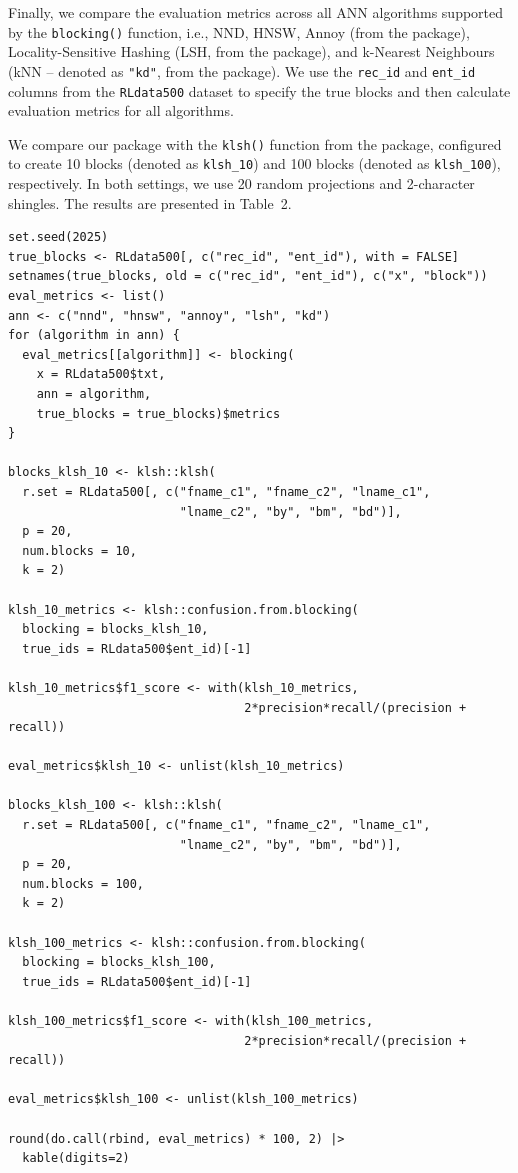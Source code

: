 Finally, we compare the evaluation metrics across all ANN algorithms
supported by the \texttt{blocking()} function, i.e., NND, HNSW, Annoy (from the
 package), Locality-Sensitive Hashing (LSH, from the
 package), and k-Nearest Neighbours (kNN -- denoted as
\texttt{"kd"}, from the  package). We use the \texttt{rec\_id} and
\texttt{ent\_id} columns from the \texttt{RLdata500} dataset to specify the true blocks
and then calculate evaluation metrics for all algorithms.

We compare our package with the \texttt{klsh()} function from the
 package, configured to create 10 blocks (denoted as
\texttt{klsh\_10}) and 100 blocks (denoted as \texttt{klsh\_100}), respectively. In both
settings, we use 20 random projections and 2-character shingles. The
results are presented in Table~2.

\begin{verbatim}
set.seed(2025)
true_blocks <- RLdata500[, c("rec_id", "ent_id"), with = FALSE]
setnames(true_blocks, old = c("rec_id", "ent_id"), c("x", "block"))
eval_metrics <- list()
ann <- c("nnd", "hnsw", "annoy", "lsh", "kd")
for (algorithm in ann) {
  eval_metrics[[algorithm]] <- blocking(
    x = RLdata500$txt,
    ann = algorithm,
    true_blocks = true_blocks)$metrics
}

blocks_klsh_10 <- klsh::klsh(
  r.set = RLdata500[, c("fname_c1", "fname_c2", "lname_c1",
                        "lname_c2", "by", "bm", "bd")],
  p = 20,
  num.blocks = 10,
  k = 2)

klsh_10_metrics <- klsh::confusion.from.blocking(
  blocking = blocks_klsh_10, 
  true_ids = RLdata500$ent_id)[-1]

klsh_10_metrics$f1_score <- with(klsh_10_metrics, 
                                 2*precision*recall/(precision + recall))

eval_metrics$klsh_10 <- unlist(klsh_10_metrics)

blocks_klsh_100 <- klsh::klsh(
  r.set = RLdata500[, c("fname_c1", "fname_c2", "lname_c1",
                        "lname_c2", "by", "bm", "bd")],
  p = 20,
  num.blocks = 100,
  k = 2)

klsh_100_metrics <- klsh::confusion.from.blocking(
  blocking = blocks_klsh_100, 
  true_ids = RLdata500$ent_id)[-1]

klsh_100_metrics$f1_score <- with(klsh_100_metrics, 
                                 2*precision*recall/(precision + recall))

eval_metrics$klsh_100 <- unlist(klsh_100_metrics)

round(do.call(rbind, eval_metrics) * 100, 2) |>
  kable(digits=2) 
\end{verbatim}

